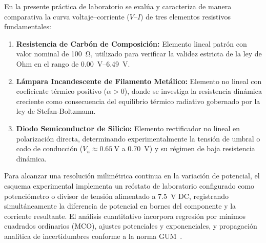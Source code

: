 En la presente práctica de laboratorio se evalúa y caracteriza de manera comparativa la curva voltaje--corriente ($V$--$I$) de tres elementos resistivos fundamentales:
\begin{enumerate}
    \item \textbf{Resistencia de Carbón de Composición:} Elemento lineal patrón con valor nominal de \qty{100}{\ohm}, utilizado para verificar la validez estricta de la ley de Ohm en el rango de \qtyrange{0,00}{6,49}{\volt}.
    \item \textbf{Lámpara Incandescente de Filamento Metálico:} Elemento no lineal con coeficiente térmico positivo ($\alpha > 0$), donde se investiga la resistencia dinámica creciente como consecuencia del equilibrio térmico radiativo gobernado por la ley de Stefan-Boltzmann.
    \item \textbf{Diodo Semiconductor de Silicio:} Elemento rectificador no lineal en polarización directa, determinando experimentalmente la tensión de umbral o codo de conducción ($V_u \approx \qty{0,65}{\volt}$ a \qty{0,70}{\volt}) y su régimen de baja resistencia dinámica.
\end{enumerate}

Para alcanzar una resolución milimétrica continua en la variación de potencial, el esquema experimental implementa un reóstato de laboratorio configurado como potenciómetro o divisor de tensión alimentado a \qty{7,5}{\volt} DC, registrando simultáneamente la diferencia de potencial en bornes del componente y la corriente resultante. El análisis cuantitativo incorpora regresión por mínimos cuadrados ordinarios (MCO), ajustes potenciales y exponenciales, y propagación analítica de incertidumbres conforme a la norma GUM~\cite{gum, taylor}.